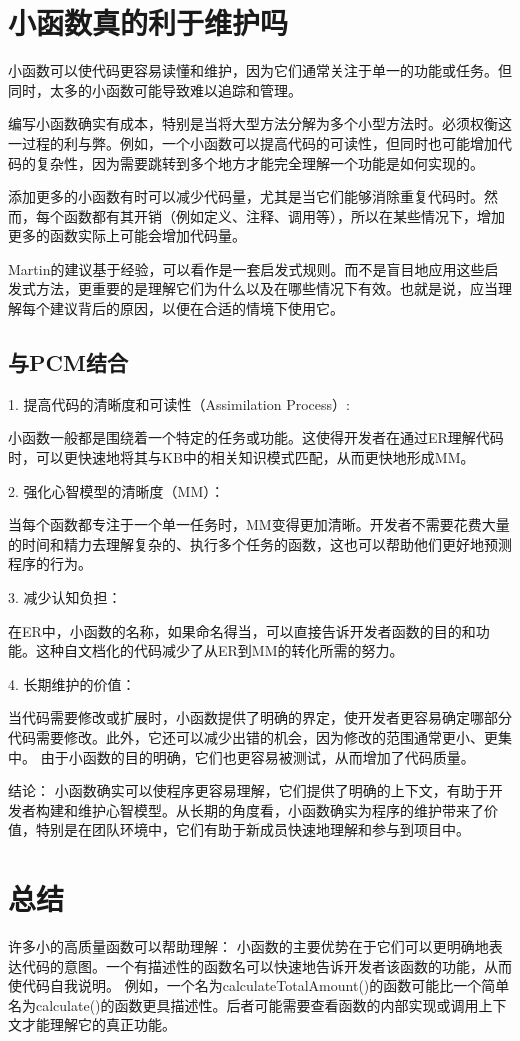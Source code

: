 \documentclass[]{ctexbook}
\begin{document}
\section{小函数真的利于维护吗}
小函数可以使代码更容易读懂和维护，因为它们通常关注于单一的功能或任务。但同时，太多的小函数可能导致难以追踪和管理。

编写小函数确实有成本，特别是当将大型方法分解为多个小型方法时。必须权衡这一过程的利与弊。例如，一个小函数可以提高代码的可读性，但同时也可能增加代码的复杂性，因为需要跳转到多个地方才能完全理解一个功能是如何实现的。

添加更多的小函数有时可以减少代码量，尤其是当它们能够消除重复代码时。然而，每个函数都有其开销（例如定义、注释、调用等），所以在某些情况下，增加更多的函数实际上可能会增加代码量。

Martin的建议基于经验，可以看作是一套启发式规则。而不是盲目地应用这些启发式方法，更重要的是理解它们为什么以及在哪些情况下有效。也就是说，应当理解每个建议背后的原因，以便在合适的情境下使用它。

\subsection{与PCM结合}
1. 提高代码的清晰度和可读性（Assimilation Process）:

小函数一般都是围绕着一个特定的任务或功能。这使得开发者在通过ER理解代码时，可以更快速地将其与KB中的相关知识模式匹配，从而更快地形成MM。

2. 强化心智模型的清晰度（MM）：

当每个函数都专注于一个单一任务时，MM变得更加清晰。开发者不需要花费大量的时间和精力去理解复杂的、执行多个任务的函数，这也可以帮助他们更好地预测程序的行为。

3. 减少认知负担：

在ER中，小函数的名称，如果命名得当，可以直接告诉开发者函数的目的和功能。这种自文档化的代码减少了从ER到MM的转化所需的努力。

4. 长期维护的价值：

当代码需要修改或扩展时，小函数提供了明确的界定，使开发者更容易确定哪部分代码需要修改。此外，它还可以减少出错的机会，因为修改的范围通常更小、更集中。
由于小函数的目的明确，它们也更容易被测试，从而增加了代码质量。

结论：
小函数确实可以使程序更容易理解，它们提供了明确的上下文，有助于开发者构建和维护心智模型。从长期的角度看，小函数确实为程序的维护带来了价值，特别是在团队环境中，它们有助于新成员快速地理解和参与到项目中。

\section{总结}
许多小的高质量函数可以帮助理解：
小函数的主要优势在于它们可以更明确地表达代码的意图。一个有描述性的函数名可以快速地告诉开发者该函数的功能，从而使代码自我说明。
例如，一个名为calculateTotalAmount()的函数可能比一个简单名为calculate()的函数更具描述性。后者可能需要查看函数的内部实现或调用上下文才能理解它的真正功能。
\end{document}
